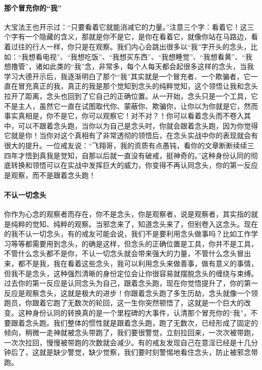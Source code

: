 \paragraph{那个冒充你的“我”}

大宝法王也开示过：“只要看着它就能消减它的力量。”注意三个字：看着它！这三个字有一个隐藏的含义，那就是你不是它，是你在看着它，就像你站在马路边，看着过往的行人一样，你只是在观察。我们内心会跳出很多以“我”字开头的念头，比如：“我想看电视”、“我想吃饭”、“我想买东西”、“我想睡觉”、“我想看黄”、“我想撸管”，诸如此类的“我”念，非常多，每个人每天都会起很多这样的念头，当我学习大德开示后，我逐渐明白了那个“我”其实就是一个冒充者、一个欺骗者，它一直在冒充真正的我，真正的我是那个觉知到念头的纯粹觉知，这个领悟让我和念头拉开了距离，念头也回到了它自己的正确位置。从一开始，念头只是一个工具，它不是主人，虽然它一直在试图取代你、蒙蔽你、欺骗你，让你以为你就是它，然而事实真相是，你不是它，你可以观察它！对不对？！你可以看着念头而不卷入其中，可以不跟着念头跑，当你以为自己是念头时，你就会跟着念头跑，因为你觉得它就是你！当你对这个真相有了非常透彻的领悟后，在念头实战中你的表现就会有很大的提升。一位戒友说：“飞翔哥，我的资质有点愚钝，看你的文章断断续续三四年才悟到真我是觉知，自那以后就一直没有破戒，挺神奇的。”这种身份认同的彻底转换和领悟可以在实战中发挥巨大的威力，你变得不再认同念头，你的第一反应是观察，而不是跟着念头跑！

\paragraph{不认一切念头}

你作为心念的观察者而存在，你不是念头，你是观察者，说是观察者，其实指的就是纯粹的觉知、纯粹的观察。当邪念来了，知道念头来了，但别卷入这念头。现在的我不认一切念头，有的戒友可能会说，我们不是要利用念头做事吗？比如工作学习等等都需要用到念头，的确是这样，但念头的正确位置是工具，你并不是工具，不管什么念头都不是你，不认一切念头就会带来强大的力量，不管什么念头冒出来，都不是我，我在看着这些念头，我可以利用念头来做善事，做有意义的事情，但我不是念头，这种强烈清晰的身份定位会让你很容易就摆脱念头的缠绕与束缚。过去你的第一反应是认同念头为自己，跟着念头跑，现在你觉悟提升了，你的第一反应是观察念头，这就是极大的进步！你跟着念头跑了多生历劫，念头就像一个领跑员，你跟着它跑了无数次的轮回，这一生你突然顿悟了，这就是一个巨大的改变。这种身份认同的转换真的是一个里程碑的大事件，认清那个冒充你的“我”，不要跟着念头跑。我们整体的惯性就是跟着念头跑，跑了无数次，已经形成了固定的倾向，稍微一走神就被念头带跑了，我们要很警觉，立刻拉回来，一次次被带跑，一次次拉回，慢慢被带跑的次数就会减少。有的戒友发现自己在意淫已经是十几分钟后了，这就是缺少警觉，缺少觉察，我们要时刻警惕地看住念头，防止被邪念带跑。

